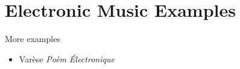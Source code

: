 
\chapter{Electronic Music Examples}
\label{examples}

More examples
\begin{itemize}
\item Var\`ese \textit{Po\`em \'Electronique}



\end{itemize}
